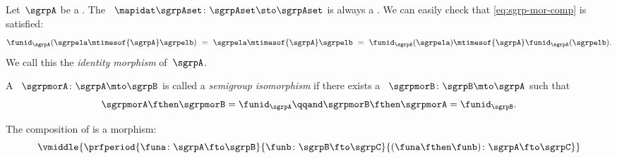 \begin{ctdefinition}
    \label{def:identity-sgrp-mor}
    Let~$\sgrpA$ be a .
    The ~$\mapidat\sgrpAset\colon \sgrpAset \sto \sgrpAset$ is always a .
    We can easily check that \cref{eq:sgrp-mor-comp} is satisfied:
    \begin{equation}
        \label{eq:identity-sgrp-mor-proof}
        \funid_\sgrpA (\sgrpela \mtimesof{\sgrpA} \sgrpelb) \ = \  \sgrpela \mtimesof{\sgrpA} \sgrpelb
        \ = \
        \funid_\sgrpA (\sgrpela )\mtimesof{\sgrpA}\funid_\sgrpA(\sgrpelb).
    \end{equation}
    We call this the \emph{identity morphism} of~$\sgrpA$.
\end{ctdefinition}
\showslides{%
    \begin{forslides}
        \begin{equation}
            \label{eq:identity-sgrp}
            \funid_\sgrpA\colon \sgrpA \fto \sgrpA
        \end{equation}
    \end{forslides}
}



\begin{ctdefinition}
    \label{def:semigroup-iso}
    A ~$\sgrpmorA\colon \sgrpA \mto \sgrpB$ is called a \emph{semigroup isomorphism} if there exists a ~$\sgrpmorB\colon \sgrpB \mto \sgrpA$ such that
    \begin{equation}
        \label{eq:sgrp-iso-cond}
        \sgrpmorA \fthen \sgrpmorB = \funid_\sgrpA
        \qqand
        \sgrpmorB \fthen \sgrpmorA = \funid_\sgrpB.
    \end{equation}
\end{ctdefinition}

\begin{lemma}
    \label{lem:semigroup-morphisms-compose}
    The composition of  is a morphism:
    \begin{equation}
        \label{eq:sgrp-mor-compo}
        \vmiddle{
            \prfperiod{
                \funa  \colon \sgrpA \fto \sgrpB
            }{
                \funb \colon  \sgrpB \fto \sgrpC
            }{
                (\funa \fthen \funb)  \colon \sgrpA \fto \sgrpC
            }
        }
    \end{equation}
\end{lemma}

